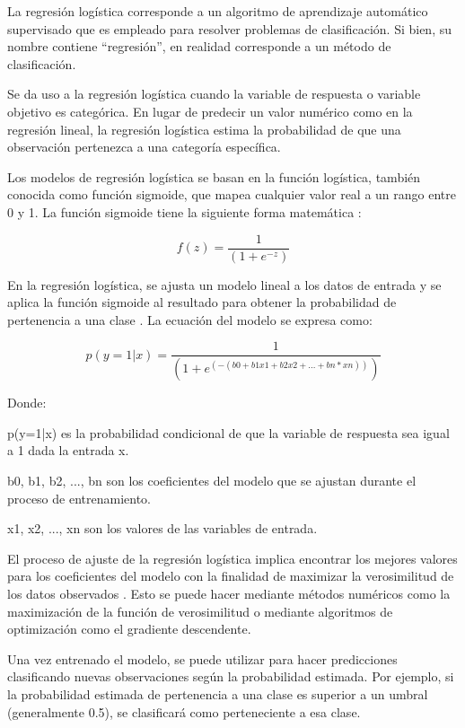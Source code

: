 La regresión logística corresponde a un algoritmo de aprendizaje automático supervisado que es empleado para resolver problemas de clasificación. Si bien, su nombre contiene “regresión”, en realidad corresponde a un método de clasificación.

Se da uso a la regresión logística cuando la variable de respuesta o variable objetivo es categórica. En lugar de predecir un valor numérico como en la regresión lineal, la regresión logística estima la probabilidad de que una observación pertenezca a una categoría específica.

Los modelos de regresión logística se basan en la función logística, también conocida como función sigmoide, que mapea cualquier valor real a un rango entre 0 y 1. La función sigmoide tiene la siguiente forma matemática \cite{logistic-reg}:

\begin{equation*}
    f(z) = \frac{1}{(1 + e^{-z})}
\end{equation*}

En la regresión logística, se ajusta un modelo lineal a los datos de entrada y se aplica la función sigmoide al resultado para obtener la probabilidad de pertenencia a una clase \cite{logistic-reg}. La ecuación del modelo se expresa como:

\begin{equation*}
    p(y=1|x) = \frac{1}{(1 + e^{(-(b0 + b1x1 + b2x2 + ... + bn*xn))})}
\end{equation*}

Donde:

p(y=1|x) es la probabilidad condicional de que la variable de respuesta sea igual a 1 dada la entrada x.

b0, b1, b2, ..., bn son los coeficientes del modelo que se ajustan durante el proceso de entrenamiento.

x1, x2, ..., xn son los valores de las variables de entrada.

El proceso de ajuste de la regresión logística implica encontrar los mejores valores para los coeficientes del modelo con la finalidad de maximizar la verosimilitud de los datos observados \cite{logistic-reg}. Esto se puede hacer mediante métodos numéricos como la maximización de la función de verosimilitud o mediante algoritmos de optimización como el gradiente descendente.

Una vez entrenado el modelo, se puede utilizar para hacer predicciones clasificando nuevas observaciones según la probabilidad estimada. Por ejemplo, si la probabilidad estimada de pertenencia a una clase es superior a un umbral (generalmente 0.5), se clasificará como perteneciente a esa clase.

